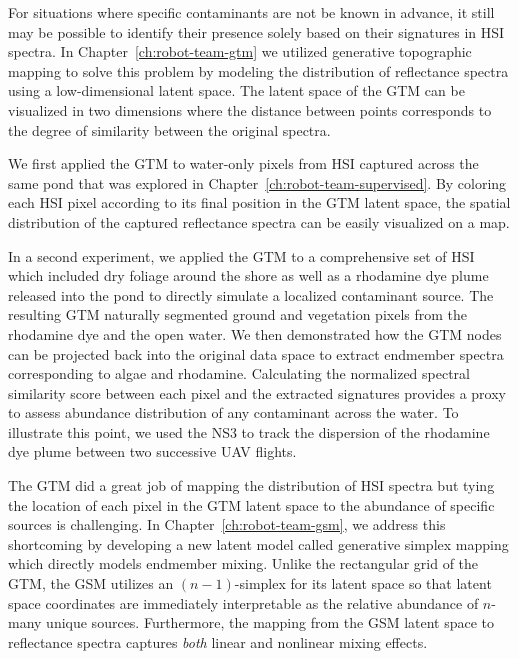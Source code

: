 
For situations where specific contaminants are not be known in advance, it still
may be possible to identify their presence solely based on their signatures in
HSI spectra. In Chapter~\ref{ch:robot-team-gtm} we utilized generative
topographic mapping to solve this problem by modeling the distribution of
reflectance spectra using a low-dimensional latent space. The latent space of
the GTM can be visualized in two dimensions where the distance between
points corresponds to the degree of similarity between the original spectra.

We first applied the GTM to water-only pixels from HSI captured across the
same pond that was explored in Chapter~\ref{ch:robot-team-supervised}. By
coloring each HSI pixel according to its final position in the GTM latent space,
the spatial distribution of the captured reflectance spectra can be easily
visualized on a map.

In a second experiment, we applied the GTM to a comprehensive set of HSI which
included dry foliage around the shore as well as a rhodamine dye plume released into the
pond to directly simulate a localized contaminant source. The resulting GTM
naturally segmented ground and vegetation pixels from the rhodamine dye and the
open water. We then demonstrated how the GTM nodes can be projected back into
the original data space to extract endmember spectra corresponding to
algae and rhodamine. Calculating the normalized spectral similarity score
between each pixel and the extracted signatures provides a proxy to assess
abundance distribution of any contaminant across the water. To illustrate this
point, we used the NS3 to track the dispersion of the rhodamine dye plume
between two successive UAV flights.



The GTM did a great job of mapping the distribution of HSI spectra but tying the
location of each pixel in the GTM latent space to the abundance of specific
sources is challenging. In Chapter~\ref{ch:robot-team-gsm}, we address this
shortcoming by developing a new latent model called generative simplex mapping
which directly models endmember mixing. Unlike the rectangular grid of the GTM,
the GSM utilizes an $(n-1)$-simplex for its latent space so that latent space
coordinates are immediately interpretable as the relative abundance of $n$-many
unique sources. Furthermore, the mapping from the GSM latent space to
reflectance spectra captures \textit{both} linear and nonlinear mixing effects.

